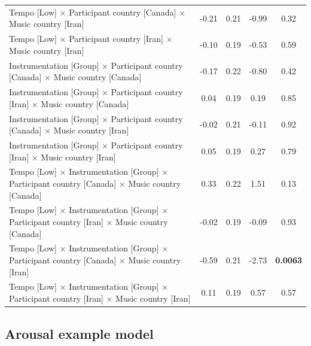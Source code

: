 \documentclass[
  bookmarksnumbered]{article}
\begin{document}
\begin{table}[H]
{\begin{tabular}[t]{lcccc}
\hspace{1em}Tempo [Low] × Participant country [Canada] × Music country [Iran] & -0.21 & 0.21 & -0.99 & 0.32\\
\hspace{1em}Tempo [Low] × Participant country [Iran] × Music country [Iran] & -0.10 & 0.19 & -0.53 & 0.59\\
\hspace{1em}Instrumentation [Group] × Participant country [Canada] × Music country [Canada] & -0.17 & 0.22 & -0.80 & 0.42\\
\hspace{1em}Instrumentation [Group] × Participant country [Iran] × Music country [Canada] & 0.04 & 0.19 & 0.19 & 0.85\\
\hspace{1em}Instrumentation [Group] × Participant country [Canada] × Music country [Iran] & -0.02 & 0.21 & -0.11 & 0.92\\
\hspace{1em}Instrumentation [Group] × Participant country [Iran] × Music country [Iran] & 0.05 & 0.19 & 0.27 & 0.79\\
\hspace{1em}Tempo [Low] × Instrumentation [Group] × Participant country [Canada] × Music country [Canada] & 0.33 & 0.22 & 1.51 & 0.13\\
\hspace{1em}Tempo [Low] × Instrumentation [Group] × Participant country [Iran] × Music country [Canada] & -0.02 & 0.19 & -0.09 & 0.93\\
\hspace{1em}Tempo [Low] × Instrumentation [Group] × Participant country [Canada] × Music country [Iran] & -0.59 & 0.21 & -2.73 & \textbf{0.0063}\\
\hspace{1em}Tempo [Low] × Instrumentation [Group] × Participant country [Iran] × Music country [Iran] & 0.11 & 0.19 & 0.57 & 0.57\\
\bottomrule
\end{tabular}}
\end{table}

\hypertarget{arousal-example-model}{%
\subsection{Arousal example model}\label{arousal-example-model}}
\end{document}
